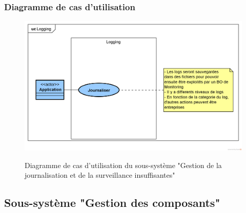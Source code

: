 \subsubsection{Diagramme de cas d'utilisation}
\begin{figure}[H]
	\centering
	\begin{minipage}{12cm}
		\centering
		{\includegraphics[height=0.35\textheight, width=1\textwidth]{fig/Logging-use-case-diagram.png}}
	\end{minipage}
	\caption{Diagramme de cas d'utilisation du sous-système "Gestion de la journalisation et de la surveillance insuffisantes"}
	\label{fig:7.19}
\end{figure}

\subsection{Sous-système "Gestion des composants"}
